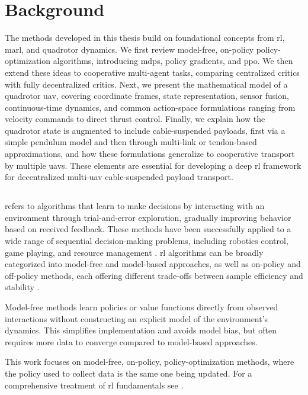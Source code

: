 \chapter{Background}
The methods developed in this thesis build on foundational concepts from \gls{rl}, \gls{marl}, and quadrotor dynamics. We first review model-free, on-policy policy-optimization algorithms, introducing \gls{mdp}s, policy gradients, and \gls{ppo}. We then extend these ideas to cooperative multi-agent tasks, comparing centralized critics with fully decentralized critics. Next, we present the mathematical model of a quadrotor \gls{uav}, covering coordinate frames, state representation, sensor fusion, continuous-time dynamics, and common action-space formulations ranging from velocity commands to direct thrust control. Finally, we explain how the quadrotor state is augmented to include cable-suspended payloads, first via a simple pendulum model and then through multi-link or tendon-based approximations, and how these formulations generalize to cooperative transport by multiple \glspl{uav}. These elements are essential for developing a deep \gls{rl} framework for decentralized multi-\gls{uav} cable-suspended payload transport.

\section{}
 refers to algorithms that learn to make decisions by interacting with an environment through trial-and-error exploration, gradually improving behavior based on received feedback. These methods have been successfully applied to a wide range of sequential decision-making problems, including robotics control, game playing, and resource management \cite{mnih2015human}. \gls{rl} algorithms can be broadly categorized into model-free and model-based approaches, as well as on-policy and off-policy methods, each offering different trade-offs between sample efficiency and stability \cite{Schulman2015TrustRP}.  

Model-free methods learn policies or value functions directly from observed interactions without constructing an explicit model of the environment's dynamics. This simplifies implementation and avoids model bias, but often requires more data to converge compared to model-based approaches.  

This work focuses on model-free, on-policy, policy-optimization methods, where the policy used to collect data is the same one being updated. For a comprehensive treatment of \gls{rl} fundamentals see \cite{SuttonBarto2018}.
